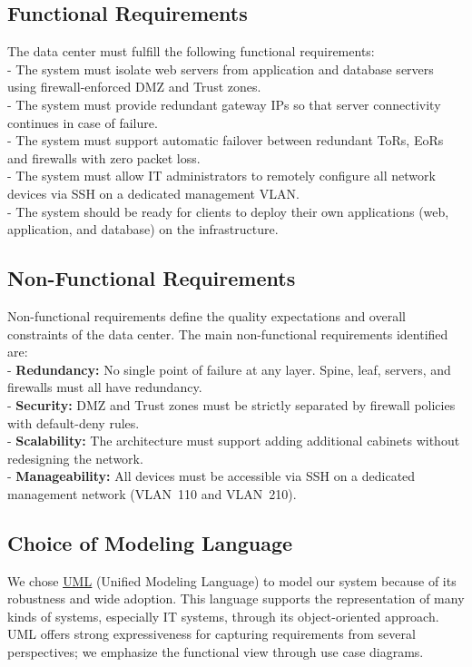 \subsection{Functional Requirements}
The data center must fulfill the following functional requirements:\\
- The system must isolate web servers from application and database servers using firewall-enforced DMZ and Trust zones.\\
- The system must provide redundant gateway IPs so that server connectivity continues in case of failure.\\
- The system must support automatic failover between redundant ToRs, EoRs and firewalls with zero packet loss.\\
- The system must allow IT administrators to remotely configure all network devices via SSH on a dedicated management VLAN.\\
- The system should be ready for clients to deploy their own applications (web, application, and database) on the infrastructure.
\subsection{Non-Functional Requirements}
Non-functional requirements define the quality expectations and overall constraints of the data center. The main non-functional requirements identified are:\\
- \textbf{Redundancy:} No single point of failure at any layer. Spine, leaf, servers, and firewalls must all have redundancy.\\
- \textbf{Security:} DMZ and Trust zones must be strictly separated by firewall policies with default-deny rules.\\
- \textbf{Scalability:} The architecture must support adding additional cabinets without redesigning the network.\\
- \textbf{Manageability:} All devices must be accessible via SSH on a dedicated management network (VLAN~110 and VLAN~210).

\subsection{Choice of Modeling Language}
We chose \hyperref[def:uml]{\underline{UML}} (Unified Modeling Language) to model our system because of its robustness and wide adoption. This language supports the representation of many kinds of systems, especially IT systems, through its object-oriented approach. UML offers strong expressiveness for capturing requirements from several perspectives; we emphasize the functional view through use case diagrams.
